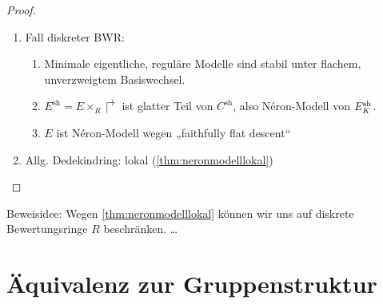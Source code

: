 \documentclass[german]{scrreprt}
\begin{document}
\begin{Satz}
\begin{proof}
\begin{enumerate}
\begin{enumerate}
      \end{enumerate}
    \item Fall diskreter BWR:
      \begin{enumerate}
      \item Minimale eigentliche, reguläre Modelle sind stabil unter
        flachem, unverzweigtem Basiswechsel.
      \item $E^\text{sh}=E\times_R\Rsh$ ist glatter Teil von
        $C^\text{sh}$, also Néron-Modell von $E_{K}^\text{sh}$.
      \item $E$ ist Néron-Modell wegen „faithfully flat descent“
      \end{enumerate}
    \item Allg. Dedekindring: lokal (\autoref{thm:neronmodelllokal})
    \end{enumerate}
  \end{proof}
\end{Satz}
Beweisidee: Wegen \autoref{thm:neronmodelllokal} können wir uns auf
diskrete Bewertungsringe $R$ beschränken.
…

\section{Äquivalenz zur Gruppenstruktur}
\end{document}
